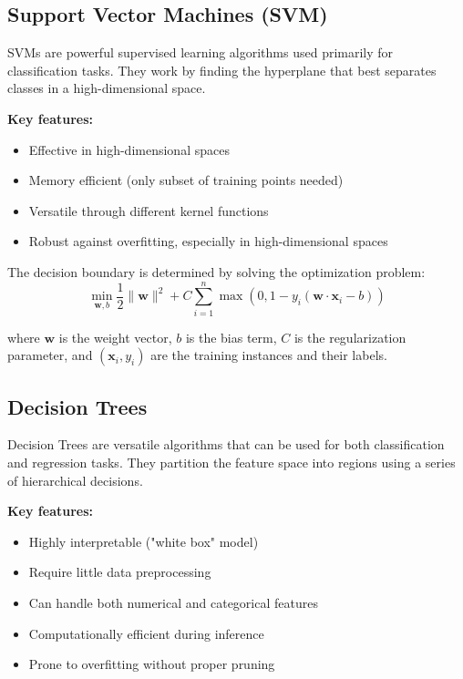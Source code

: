 \documentclass[11pt,a4paper]{report}
\begin{document}
\subsection{Support Vector Machines (SVM)}
SVMs are powerful supervised learning algorithms used primarily for classification tasks. They work by finding the hyperplane that best separates classes in a high-dimensional space.

\textbf{Key features:}
\begin{itemize}
    \item Effective in high-dimensional spaces
    \item Memory efficient (only subset of training points needed)
    \item Versatile through different kernel functions
    \item Robust against overfitting, especially in high-dimensional spaces
\end{itemize}

The decision boundary is determined by solving the optimization problem:
\begin{equation}
\min_{\mathbf{w}, b} \frac{1}{2} \|\mathbf{w}\|^2 + C \sum_{i=1}^{n} \max(0, 1 - y_i(\mathbf{w} \cdot \mathbf{x}_i - b))
\end{equation}

where $\mathbf{w}$ is the weight vector, $b$ is the bias term, $C$ is the regularization parameter, and $(\mathbf{x}_i, y_i)$ are the training instances and their labels.

\subsection{Decision Trees}
Decision Trees are versatile algorithms that can be used for both classification and regression tasks. They partition the feature space into regions using a series of hierarchical decisions.

\textbf{Key features:}
\begin{itemize}
    \item Highly interpretable ("white box" model)
    \item Require little data preprocessing
    \item Can handle both numerical and categorical features
    \item Computationally efficient during inference
    \item Prone to overfitting without proper pruning
\end{itemize}
\end{document}
